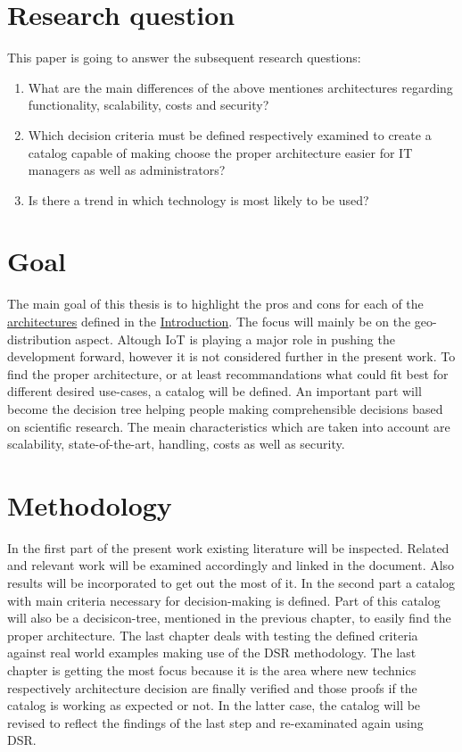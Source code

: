 \documentclass[MSC,Master,english]{twbook}%
\begin{document}
\section{Research question}
\label{sec:rq}
This paper is going to answer the subsequent research questions:
\begin{enumerate}
    \item What are the main differences of the above mentiones architectures regarding   functionality, scalability, costs and security?
    \item Which decision criteria must be defined respectively examined to create a catalog capable
    of making choose the proper architecture easier for \ac{IT} managers as well as administrators?
    \item Is there a trend in which technology is most likely to be used?
\end{enumerate}

\section{Goal}
\label{sec:goal}
The main goal of this thesis is to highlight the pros and cons for each of the \hyperref[item:architecture]{architectures} defined in the \hyperref[chap:introduction]{Introduction}. The focus will mainly be on the geo-distribution aspect. Altough \ac{IoT} is playing a major role in pushing the development forward, however it is not considered further in the present work. To find the proper architecture, or at least recommandations what could fit best for different desired use-cases, a catalog will be defined. An important part will become the decision tree helping people making comprehensible decisions based on scientific research. The meain characteristics which are taken into account are scalability, state-of-the-art, handling, costs as well as security.

\section{Methodology}
\label{sec:methodology}
In the first part of the present work existing literature will be inspected. Related and relevant work will be examined accordingly and linked in the document. Also results will be incorporated to get out the most of it. In the second part a catalog with main criteria necessary for decision-making is defined. Part of this catalog will also be a decisicon-tree, mentioned in the previous chapter, to easily find the proper architecture. The last chapter deals with testing the defined criteria against real world examples making use of the \ac{DSR} methodology. The last chapter is getting the most focus because it is the area where new technics respectively architecture decision are finally verified and those proofs if the catalog is working as expected or not. In the latter case, the catalog will be revised to reflect the findings of the last step and re-examinated again using \ac{DSR}.
\end{document}
